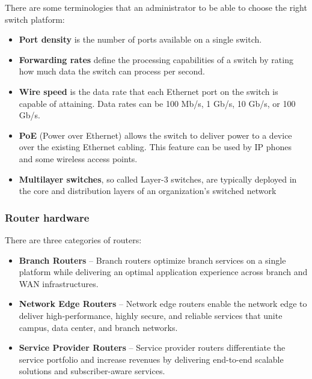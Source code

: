There are some terminologies that an administrator to be able to choose the right switch platform:
\begin{itemize}
\item \textbf{Port density} is the number of ports available on a single switch.
\item \textbf{Forwarding rates} define the processing capabilities of a switch by rating how much data the switch can process per second.
\item \textbf{Wire speed}  is the data rate that each Ethernet port on the switch is capable of attaining. Data rates can be 100 Mb/s, 1 Gb/s, 10 Gb/s, or 100 Gb/s.
\item \textbf{PoE} (Power over Ethernet) allows the switch to deliver power to a device over the existing Ethernet cabling.  This feature can be used by IP phones and some wireless access points.
\item \textbf{Multilayer switches}, so called Layer-3 switches,  are typically deployed in the core and distribution layers of an organization's switched network
\end{itemize}
\subsubsection{Router hardware}
There are three categories of routers:
\begin{itemize}
\item \textbf{Branch Routers} -- Branch routers optimize branch services on a single platform while delivering an optimal application experience across branch and WAN infrastructures.
\item \textbf{Network Edge Routers} -- Network edge routers enable the network edge to deliver high-performance, highly secure, and reliable services that unite campus, data center, and branch networks.
\item \textbf{Service Provider Routers} -- Service provider routers differentiate the service portfolio and increase revenues by delivering end-to-end scalable solutions and subscriber-aware services.
\end{itemize}
